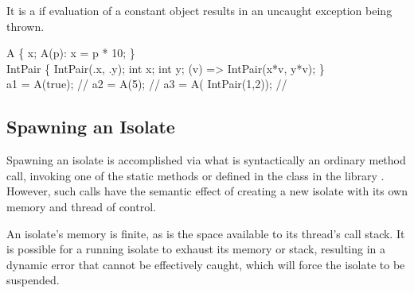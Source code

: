 \documentclass[makeidx]{article}
\begin{document}
{\LMHash{}%
It is a  if evaluation of a constant object
results in an uncaught exception being thrown.


\begin{dartCode}
\CLASS{} A \{
  \FINAL{} x;
  \CONST{} A(p): x = p * 10;
\}
\\
\CLASS{} IntPair \{
  \CONST{} IntPair(\THIS.x, \THIS.y);
  \FINAL{} int x;
  \FINAL{} int y;
  \OPERATOR *(v) => \NEW{} IntPair(x*v, y*v);
\}
\\
\CONST a1 = \CONST{} A(true); // 
\CONST a2 = \CONST{} A(5); // 
\CONST a3 = \CONST{} A(\CONST{} IntPair(1,2)); // 
\end{dartCode}



\subsection{Spawning an Isolate}

\LMHash{}%
Spawning an isolate is accomplished via what is syntactically
an ordinary method call,
invoking one of the static methods  or  defined in
the  class in the library .
However, such calls have the semantic effect of creating
a new isolate with its own memory and thread of control.

\LMHash{}%
An isolate's memory is finite, as is the space available to
its thread's call stack.
It is possible for a running isolate to exhaust its memory or stack,
resulting in a dynamic error that cannot be effectively caught,
which will force the isolate to be suspended.



}
\end{document}

